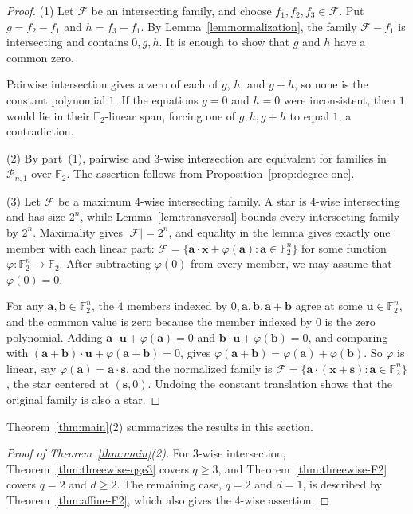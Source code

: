 \documentclass[12pt,reqno]{amsart}
\theoremstyle{definition}
\newcommand{\F}{\mathbb{F}}
\newcommand{\cF}{\mathcal F}
\newcommand{\cP}{\mathcal P}
\begin{document}
\begin{proof}

(1) Let $\cF$ be an intersecting family, and choose
$f_1,f_2,f_3\in\cF$. Put $g=f_2-f_1$ and $h=f_3-f_1$. By
Lemma~\ref{lem:normalization}, the family $\cF-f_1$ is intersecting
and contains $0,g,h$. It is enough to show that $g$ and $h$ have a
common zero.

Pairwise intersection gives a zero of each of $g$, $h$, and $g+h$,
so none is the constant polynomial $1$. If the equations $g=0$ and
$h=0$ were inconsistent, then $1$ would lie in their
$\F_2$-linear span, forcing one of $g,h,g+h$ to equal $1$, a
contradiction.


(2) By part~\textup{(1)}, pairwise and 3-wise intersection are equivalent
for families in $\cP_{n,1}$ over $\F_2$. The assertion follows from
Proposition~\ref{prop:degree-one}.

(3) Let $\cF$ be a maximum 4-wise intersecting family. A star is 4-wise
intersecting and has size $2^n$, while Lemma~\ref{lem:transversal} bounds every
intersecting family by $2^n$. Maximality gives $|\cF|=2^n$, and equality in the
lemma gives exactly one member with each linear part:
$\cF=\{\mathbf a\cdot\mathbf x+\varphi(\mathbf a):\mathbf a\in\F_2^n\}$ for some
function $\varphi\colon\F_2^n\to\F_2$. After subtracting $\varphi(0)$ from every
member, we may assume that $\varphi(0)=0$.

For any $\mathbf a,\mathbf b\in\F_2^n$, the $4$ members indexed by $0,\mathbf a,\mathbf b,\mathbf a+\mathbf b$ agree at some $\mathbf u\in\F_2^n$, and the common value is zero because the member indexed by $0$ is the zero polynomial. Adding $\mathbf a\cdot\mathbf u+\varphi(\mathbf a)=0$ and $\mathbf b\cdot\mathbf u+\varphi(\mathbf b)=0$, and comparing with $(\mathbf a+\mathbf b)\cdot\mathbf u+\varphi(\mathbf a+\mathbf b)=0$, gives $\varphi(\mathbf a+\mathbf b)=\varphi(\mathbf a)+\varphi(\mathbf b)$. So $\varphi$ is linear, say $\varphi(\mathbf a)=\mathbf a\cdot\mathbf s$, and the normalized family is $\cF=\{\mathbf a\cdot(\mathbf x+\mathbf s):\mathbf a\in\F_2^n\}$, the star centered at $(\mathbf s,0)$. Undoing the constant translation shows that the original family is also a star.
\end{proof}

Theorem~\ref{thm:main}(2) summarizes the results in this section.

\begin{proof}[Proof of Theorem~\ref{thm:main}(2)]
For 3-wise intersection, Theorem~\ref{thm:threewise-qge3} covers $q\geq3$, and Theorem~\ref{thm:threewise-F2} covers $q=2$ and $d\geq 2$. The remaining case, $q=2$ and $d=1$, is described by Theorem~\ref{thm:affine-F2}, which also gives the 4-wise assertion. 
\end{proof}
\end{document}
